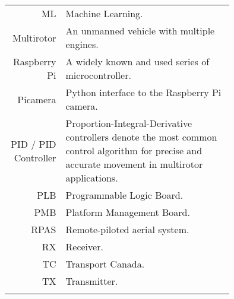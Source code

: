 \begin{tabular}[h]{rp{0.75\linewidth}}
    ML & Machine Learning.\\
    Multirotor & An unmanned vehicle with multiple engines. \\
    Raspberry Pi & A widely known and used series of microcontroller. \\
    Picamera & Python interface to the Raspberry Pi camera. \\
    PID / PID Controller & Proportion-Integral-Derivative controllers denote the most common control algorithm for precise and accurate movement in multirotor applications.\\
    PLB & Programmable Logic Board. \\
    PMB & Platform Management Board. \\
    RPAS & Remote-piloted aerial system.\\
    RX & Receiver.\\
    TC & Transport Canada.\\
    TX & Transmitter.\\
     & \\

    \hline

\end{tabular}
